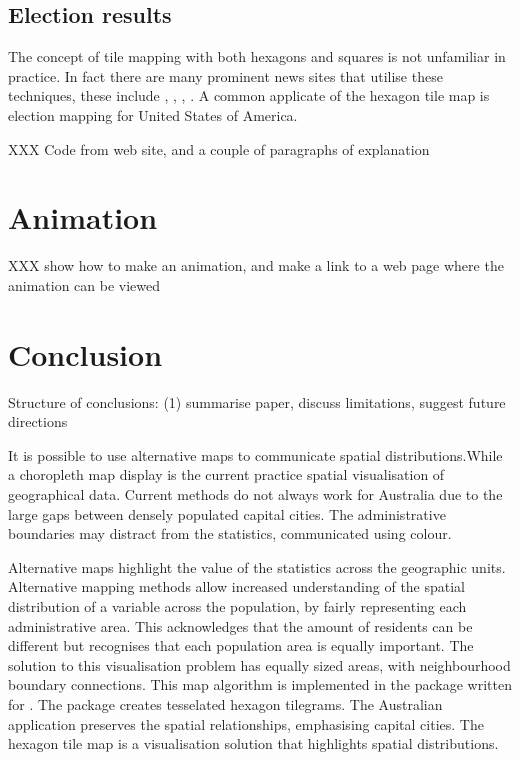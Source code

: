 \documentclass[
]{jss}
\begin{document}
\hypertarget{election-results}{%
\subsection{Election results}\label{election-results}}

The concept of tile mapping with both hexagons and squares is not
unfamiliar in practice. In fact there are many prominent news sites that
utilise these techniques, these include \citep{NPR},
\citep{FiveThirtyEight}, \citep{WSJ}, \citep{WP}. A common applicate of
the hexagon tile map is election mapping for United States of America.

XXX Code from web site, and a couple of paragraphs of explanation

\hypertarget{animation}{%
\section{Animation}\label{animation}}

XXX show how to make an animation, and make a link to a web page where
the animation can be viewed

\hypertarget{conclusion}{%
\section{Conclusion}\label{conclusion}}

Structure of conclusions: (1) summarise paper, discuss limitations,
suggest future directions

It is possible to use alternative maps to communicate spatial
distributions.While a choropleth map display is the current practice
spatial visualisation of geographical data. Current methods do not
always work for Australia due to the large gaps between densely
populated capital cities. The administrative boundaries may distract
from the statistics, communicated using colour.

Alternative maps highlight the value of the statistics across the
geographic units. Alternative mapping methods allow increased
understanding of the spatial distribution of a variable across the
population, by fairly representing each administrative area. This
acknowledges that the amount of residents can be different but
recognises that each population area is equally important. The solution
to this visualisation problem has equally sized areas, with
neighbourhood boundary connections. This map algorithm is implemented in
the  \citet{sugarbag} package written for 
\citet{R}. The  package creates tesselated hexagon
tilegrams. The Australian application preserves the spatial
relationships, emphasising capital cities. The hexagon tile map is a
visualisation solution that highlights spatial distributions.
\end{document}
